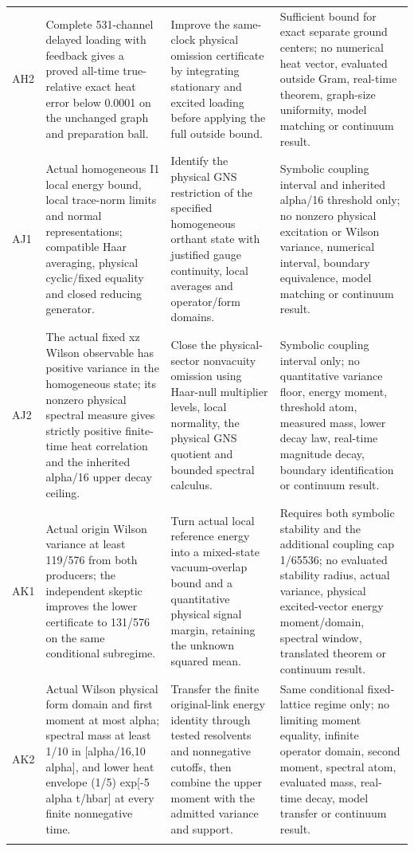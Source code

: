 \begin{longtable}{@{}>{\raggedright\arraybackslash}p{13mm}>{\raggedright\arraybackslash}p{52mm}>{\raggedright\arraybackslash}p{35mm}>{\raggedright\arraybackslash}p{47mm}@{}}
AH2 & Complete 531-channel delayed loading with feedback gives a proved all-time true-relative exact heat error below 0.0001 on the unchanged graph and preparation ball. & Improve the same-clock physical omission certificate by integrating stationary and excited loading before applying the full outside bound. & Sufficient bound for exact separate ground centers; no numerical heat vector, evaluated outside Gram, real-time theorem, graph-size uniformity, model matching or continuum result. \\ \addlinespace
AJ1 & Actual homogeneous I1 local energy bound, local trace-norm limits and normal representations; compatible Haar averaging, physical cyclic/fixed equality and closed reducing generator. & Identify the physical GNS restriction of the specified homogeneous orthant state with justified gauge continuity, local averages and operator/form domains. & Symbolic coupling interval and inherited alpha/16 threshold only; no nonzero physical excitation or Wilson variance, numerical interval, boundary equivalence, model matching or continuum result. \\ \addlinespace
AJ2 & The actual fixed xz Wilson observable has positive variance in the homogeneous state; its nonzero physical spectral measure gives strictly positive finite-time heat correlation and the inherited alpha/16 upper decay ceiling. & Close the physical-sector nonvacuity omission using Haar-null multiplier levels, local normality, the physical GNS quotient and bounded spectral calculus. & Symbolic coupling interval only; no quantitative variance floor, energy moment, threshold atom, measured mass, lower decay law, real-time magnitude decay, boundary identification or continuum result. \\ \addlinespace
AK1 & Actual origin Wilson variance at least 119/576 from both producers; the independent skeptic improves the lower certificate to 131/576 on the same conditional subregime. & Turn actual local reference energy into a mixed-state vacuum-overlap bound and a quantitative physical signal margin, retaining the unknown squared mean. & Requires both symbolic stability and the additional coupling cap 1/65536; no evaluated stability radius, actual variance, physical excited-vector energy moment/domain, spectral window, translated theorem or continuum result. \\ \addlinespace
AK2 & Actual Wilson physical form domain and first moment at most alpha; spectral mass at least 1/10 in [alpha/16,10 alpha], and lower heat envelope (1/5) exp[-5 alpha t/hbar] at every finite nonnegative time. & Transfer the finite original-link energy identity through tested resolvents and nonnegative cutoffs, then combine the upper moment with the admitted variance and support. & Same conditional fixed-lattice regime only; no limiting moment equality, infinite operator domain, second moment, spectral atom, evaluated mass, real-time decay, model transfer or continuum result. \\ \addlinespace
\bottomrule
\end{longtable}
\endgroup
